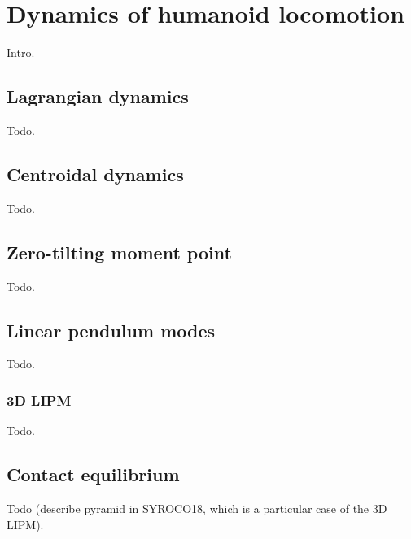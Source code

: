 \chapter{Dynamics of humanoid locomotion}
Intro.

\section{Lagrangian dynamics}
Todo.

\section{Centroidal dynamics}
Todo.

\section{Zero-tilting moment point}
Todo.

\section{Linear pendulum modes}
Todo.

\subsection{3D LIPM}
Todo.

\section{Contact equilibrium}
Todo (describe pyramid in SYROCO18, which is a particular case of the 3D LIPM).
